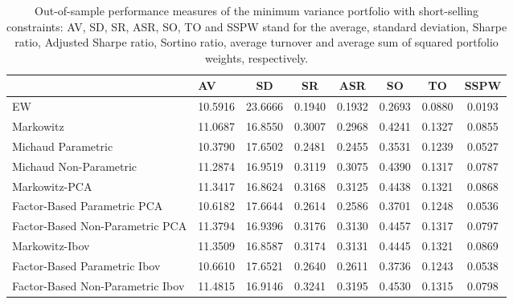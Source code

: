 \begin{table}

\caption{\label{tab:empirical_mvp}Out-of-sample performance measures of the minimum variance portfolio with short-selling constraints: AV, SD, SR, ASR, SO, TO and SSPW stand for the average, standard deviation, Sharpe ratio, Adjusted Sharpe ratio, Sortino ratio, average turnover and average sum of squared portfolio weights, respectively.}
\centering
\begin{tabular}[t]{l|l|c|c|c|c|c|c}
\hline
  & AV & SD & SR & ASR & SO & TO & SSPW\\
\hline
EW & 10.5916 & 23.6666 & 0.1940 & 0.1932 & 0.2693 & 0.0880 & 0.0193\\
\hline
Markowitz & 11.0687 & 16.8550 & 0.3007 & 0.2968 & 0.4241 & 0.1327 & 0.0855\\
\hline
Michaud Parametric & 10.3790 & 17.6502 & 0.2481 & 0.2455 & 0.3531 & 0.1239 & 0.0527\\
\hline
Michaud Non-Parametric & 11.2874 & 16.9519 & 0.3119 & 0.3075 & 0.4390 & 0.1317 & 0.0787\\
\hline
Markowitz-PCA & 11.3417 & 16.8624 & 0.3168 & 0.3125 & 0.4438 & 0.1321 & 0.0868\\
\hline
Factor-Based Parametric PCA & 10.6182 & 17.6644 & 0.2614 & 0.2586 & 0.3701 & 0.1248 & 0.0536\\
\hline
Factor-Based Non-Parametric PCA & 11.3794 & 16.9396 & 0.3176 & 0.3130 & 0.4457 & 0.1317 & 0.0797\\
\hline
Markowitz-Ibov & 11.3509 & 16.8587 & 0.3174 & 0.3131 & 0.4445 & 0.1321 & 0.0869\\
\hline
Factor-Based Parametric Ibov & 10.6610 & 17.6521 & 0.2640 & 0.2611 & 0.3736 & 0.1243 & 0.0538\\
\hline
Factor-Based Non-Parametric Ibov & 11.4815 & 16.9146 & 0.3241 & 0.3195 & 0.4530 & 0.1315 & 0.0798\\
\hline
\end{tabular}
\end{table}
